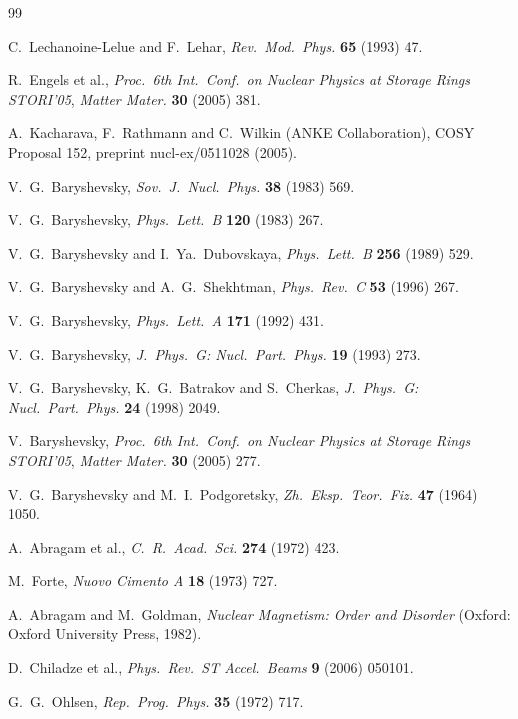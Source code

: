 \documentclass[11pt,a4paper]{article}
\begin{document}
\begin{thebibliography}{99}

C.~Lechanoine-Lelue and F.~Lehar, \textit{Rev.\ Mod.\ Phys.} \textbf{65} (1993) 47.

R.~Engels et al., \textit{Proc.\ 6th Int.\ Conf.\ on Nuclear Physics at Storage Rings STORI'05},
\textit{Matter Mater.} \textbf{30} (2005) 381.

A.~Kacharava, F.~Rathmann and C.~Wilkin (ANKE Collaboration),
COSY Proposal 152, preprint nucl-ex/0511028 (2005).

V.~G.~Baryshevsky, \textit{Sov.\ J.\ Nucl.\ Phys.} \textbf{38} (1983) 569.

V.~G.~Baryshevsky, \textit{Phys.\ Lett.\ B} \textbf{120} (1983) 267.

V.~G.~Baryshevsky and I.~Ya.~Dubovskaya, \textit{Phys.\ Lett.\ B} \textbf{256} (1989) 529.

V.~G.~Baryshevsky and A.~G.~Shekhtman, \textit{Phys.\ Rev.\ C} \textbf{53} (1996) 267.

V.~G.~Baryshevsky, \textit{Phys.\ Lett.\ A} \textbf{171} (1992) 431.

V.~G.~Baryshevsky, \textit{J.\ Phys.\ G: Nucl.\ Part.\ Phys.} \textbf{19} (1993) 273.

V.~G.~Baryshevsky, K.~G.~Batrakov and S.~Cherkas,
\textit{J.\ Phys.\ G: Nucl.\ Part.\ Phys.} \textbf{24} (1998) 2049.

V.~Baryshevsky, \textit{Proc.\ 6th Int.\ Conf.\ on Nuclear Physics at Storage Rings STORI'05},
\textit{Matter Mater.} \textbf{30} (2005) 277.

V.~G.~Baryshevsky and M.~I.~Podgoretsky, \textit{Zh.\ Eksp.\ Teor.\ Fiz.} \textbf{47} (1964) 1050.

A.~Abragam et al., \textit{C.\ R.\ Acad.\ Sci.} \textbf{274} (1972) 423.

M.~Forte, \textit{Nuovo Cimento A} \textbf{18} (1973) 727.

A.~Abragam and M.~Goldman, \textit{Nuclear Magnetism: Order and Disorder}
(Oxford: Oxford University Press, 1982).

D.~Chiladze et al., \textit{Phys.\ Rev.\ ST Accel.\ Beams} \textbf{9} (2006) 050101.

G.~G.~Ohlsen, \textit{Rep.\ Prog.\ Phys.} \textbf{35} (1972) 717.


\end{thebibliography}
\end{document}
